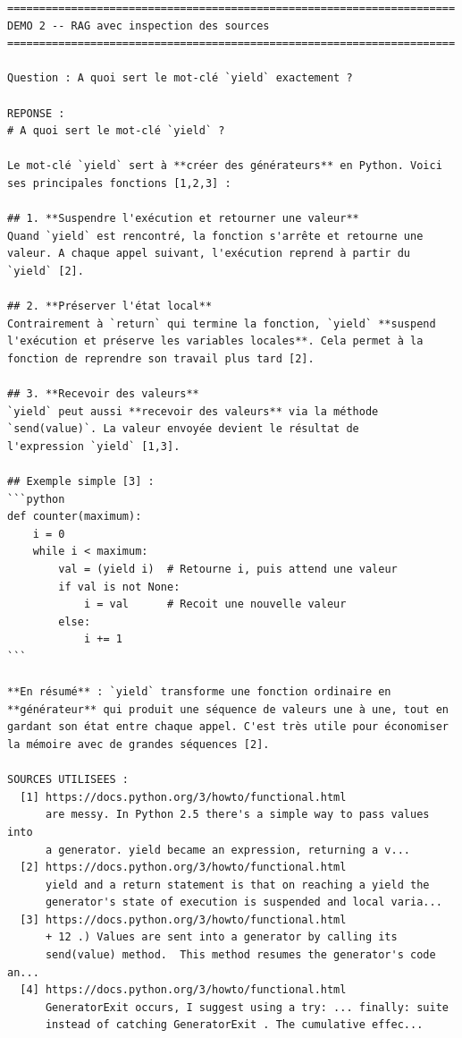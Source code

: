 \documentclass[11pt,a4paper]{article}
\begin{document}
\begin{tcolorbox}[
  colback=white,
  colframe=black!50,
  coltitle=black,
  fonttitle=\footnotesize\bfseries,
  fontupper=\footnotesize,
  title=Sortie de l'exécution,
  breakable,
]
\begin{verbatim}
======================================================================
DEMO 2 -- RAG avec inspection des sources
======================================================================

Question : A quoi sert le mot-clé `yield` exactement ?

REPONSE :
# A quoi sert le mot-clé `yield` ?

Le mot-clé `yield` sert à **créer des générateurs** en Python. Voici
ses principales fonctions [1,2,3] :

## 1. **Suspendre l'exécution et retourner une valeur**
Quand `yield` est rencontré, la fonction s'arrête et retourne une
valeur. A chaque appel suivant, l'exécution reprend à partir du
`yield` [2].

## 2. **Préserver l'état local**
Contrairement à `return` qui termine la fonction, `yield` **suspend
l'exécution et préserve les variables locales**. Cela permet à la
fonction de reprendre son travail plus tard [2].

## 3. **Recevoir des valeurs**
`yield` peut aussi **recevoir des valeurs** via la méthode
`send(value)`. La valeur envoyée devient le résultat de
l'expression `yield` [1,3].

## Exemple simple [3] :
```python
def counter(maximum):
    i = 0
    while i < maximum:
        val = (yield i)  # Retourne i, puis attend une valeur
        if val is not None:
            i = val      # Recoit une nouvelle valeur
        else:
            i += 1
```

**En résumé** : `yield` transforme une fonction ordinaire en
**générateur** qui produit une séquence de valeurs une à une, tout en
gardant son état entre chaque appel. C'est très utile pour économiser
la mémoire avec de grandes séquences [2].

SOURCES UTILISEES :
  [1] https://docs.python.org/3/howto/functional.html
      are messy. In Python 2.5 there's a simple way to pass values into
      a generator. yield became an expression, returning a v...
  [2] https://docs.python.org/3/howto/functional.html
      yield and a return statement is that on reaching a yield the
      generator's state of execution is suspended and local varia...
  [3] https://docs.python.org/3/howto/functional.html
      + 12 .) Values are sent into a generator by calling its
      send(value) method.  This method resumes the generator's code an...
  [4] https://docs.python.org/3/howto/functional.html
      GeneratorExit occurs, I suggest using a try: ... finally: suite
      instead of catching GeneratorExit . The cumulative effec...
\end{verbatim}
\end{tcolorbox}
\end{document}
